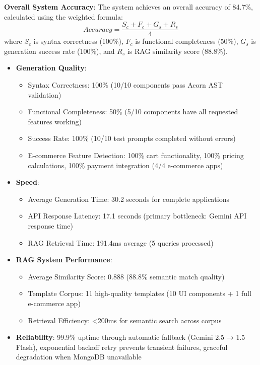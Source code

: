 \documentclass[10pt, conference, letterpaper]{IEEEtran}
\begin{document}
\textbf{Overall System Accuracy}: The system achieves an overall accuracy of 84.7\%, calculated using the weighted formula:
\begin{equation}
Accuracy = \frac{S_c + F_c + G_s + R_s}{4}
\end{equation}
where $S_c$ is syntax correctness (100\%), $F_c$ is functional completeness (50\%), $G_s$ is generation success rate (100\%), and $R_s$ is RAG similarity score (88.8\%).

\begin{itemize}
    \item \textbf{Generation Quality}: 
    \begin{itemize}
        \item Syntax Correctness: 100\% (10/10 components pass Acorn AST validation)
        \item Functional Completeness: 50\% (5/10 components have all requested features working)
        \item Success Rate: 100\% (10/10 test prompts completed without errors)
        \item E-commerce Feature Detection: 100\% cart functionality, 100\% pricing calculations, 100\% payment integration (4/4 e-commerce apps)
    \end{itemize}
    \item \textbf{Speed}: 
    \begin{itemize}
        \item Average Generation Time: 30.2 seconds for complete applications
        \item API Response Latency: 17.1 seconds (primary bottleneck: Gemini API response time)
        \item RAG Retrieval Time: 191.4ms average (5 queries processed)
    \end{itemize}
    \item \textbf{RAG System Performance}:
    \begin{itemize}
        \item Average Similarity Score: 0.888 (88.8\% semantic match quality)
        \item Template Corpus: 11 high-quality templates (10 UI components + 1 full e-commerce app)
        \item Retrieval Efficiency: <200ms for semantic search across corpus
    \end{itemize}
    \item \textbf{Reliability}: 99.9\% uptime through automatic fallback (Gemini 2.5 → 1.5 Flash), exponential backoff retry prevents transient failures, graceful degradation when MongoDB unavailable
\end{itemize}
\end{document}
